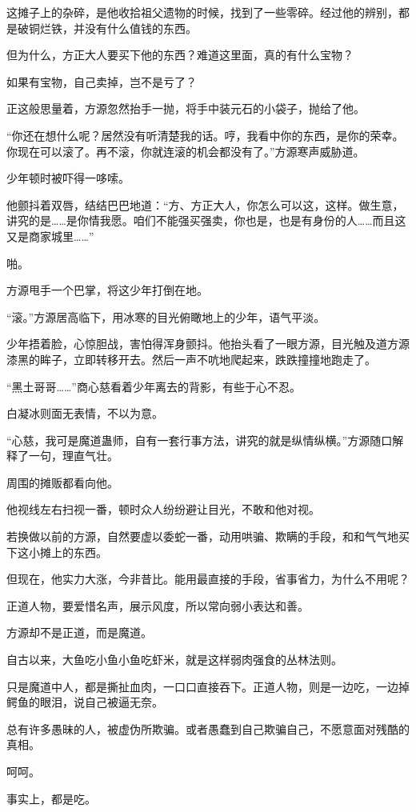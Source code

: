 \begin{this_body}
这摊子上的杂碎，是他收拾祖父遗物的时候，找到了一些零碎。经过他的辨别，都是破铜烂铁，并没有什么值钱的东西。

但为什么，方正大人要买下他的东西？难道这里面，真的有什么宝物？

如果有宝物，自己卖掉，岂不是亏了？

正这般思量着，方源忽然抬手一抛，将手中装元石的小袋子，抛给了他。

“你还在想什么呢？居然没有听清楚我的话。哼，我看中你的东西，是你的荣幸。你现在可以滚了。再不滚，你就连滚的机会都没有了。”方源寒声威胁道。

少年顿时被吓得一哆嗦。

他颤抖着双唇，结结巴巴地道：“方、方正大人，你怎么可以这，这样。做生意，讲究的是……是你情我愿。咱们不能强买强卖，你也是，也是有身份的人……而且这又是商家城里……”

啪。

方源甩手一个巴掌，将这少年打倒在地。

“滚。”方源居高临下，用冰寒的目光俯瞰地上的少年，语气平淡。

少年捂着脸，心惊胆战，害怕得浑身颤抖。他抬头看了一眼方源，目光触及道方源漆黑的眸子，立即转移开去。然后一声不吭地爬起来，跌跌撞撞地跑走了。

“黑土哥哥……”商心慈看着少年离去的背影，有些于心不忍。

白凝冰则面无表情，不以为意。

“心慈，我可是魔道蛊师，自有一套行事方法，讲究的就是纵情纵横。”方源随口解释了一句，理直气壮。

周围的摊贩都看向他。

他视线左右扫视一番，顿时众人纷纷避让目光，不敢和他对视。

若换做以前的方源，自然要虚以委蛇一番，动用哄骗、欺瞒的手段，和和气气地买下这小摊上的东西。

但现在，他实力大涨，今非昔比。能用最直接的手段，省事省力，为什么不用呢？

正道人物，要爱惜名声，展示风度，所以常向弱小表达和善。

方源却不是正道，而是魔道。

自古以来，大鱼吃小鱼小鱼吃虾米，就是这样弱肉强食的丛林法则。

只是魔道中人，都是撕扯血肉，一口口直接吞下。正道人物，则是一边吃，一边掉鳄鱼的眼泪，说自己被逼无奈。

总有许多愚昧的人，被虚伪所欺骗。或者愚蠢到自己欺骗自己，不愿意面对残酷的真相。

呵呵。

事实上，都是吃。


\end{this_body}
